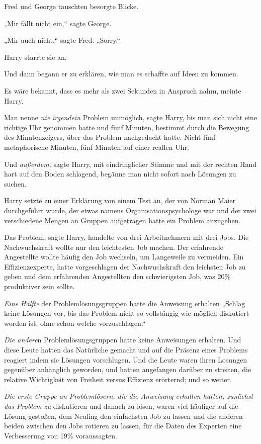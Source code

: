{Fred und George tauschten besorgte Blicke.

„Mir fällt nicht ein,“ sagte George.

„Mir auch nicht,“ sagte Fred. „Sorry.“

Harry starrte sie an.

Und dann begann er zu erklären, wie man es schaffte auf Ideen zu kommen.

Es wäre bekannt, dass es mehr als zwei Sekunden in Anspruch nahm, meinte Harry.

Man nenne \emph{nie} \emph{irgendein} Problem unmöglich, sagte Harry, bis man sich nicht eine richtige Uhr genommen hatte und fünf Minuten, bestimmt durch die Bewegung des Minutenzeigers, über das Problem nachgedacht hatte. Nicht fünf metaphorische Minuten, fünf Minuten auf einer reallen Uhr.

Und \emph{außerdem,} sagte Harry, mit eindringlicher Stimme und mit der rechten Hand hart auf den Boden schlagend, begänne man nicht sofort nach Lösungen zu suchen.

Harry setzte zu einer Erklärung von einem Test an, der von Norman Maier durchgeführt wurde, der etwas namens Organisationspsychologe war und der zwei verschiedene Mengen an Gruppen aufgetragen hatte ein Problem anzugehen.

Das Problem, sagte Harry, handelte von drei Arbeitnehmern mit drei Jobs. Die Nachwuchskraft wollte nur den leichtesten Job machen. Der erfahrende Angestellte wollte häufig den Job wechseln, um Langeweile zu vermeiden. Ein Effizienzexperte, hatte vorgeschlagen der Nachwuchskraft den leichsten Job zu geben und dem erfahrenden Angestellten den schwierigsten Job, was 20\% produktiver sein sollte.

\emph{Eine Hälfte} der Problemlösungsgruppen hatte die Anweisung erhalten „Schlag keine Lösungen vor, bis das Problem nicht so vollstängig wie möglich diskutiert worden ist, ohne schon welche vorzuschlagen.“

\emph{Die andere}n Problemlösungsgruppen hatte keine Anweisungen erhalten. Und diese Leute hatten das Natürliche gemacht und auf die Präsenz eines Problems reagiert indem sie Lösungen vorschlugen. Und die Leute waren ihren Losungen gegenüber anhänglich geworden, und hatten angefangen darüber zu streiten, die relative Wichtigkeit von Freiheit versus Effizienz erörternd; und so weiter.

\emph{Die erste Gruppe an Problemlösern, die die Anweisung erhalten hatten, zunächst das Problem zu} diskutieren und danach zu lösen, waren viel häufiger auf die Lösung gestoßen, dem Neuling den einfachsten Job zu lassen und die anderen beiden zwischen den Jobs rotieren zu lassen, für die Daten des Experten eine Verbesserung von 19\% voraussagten.

}
